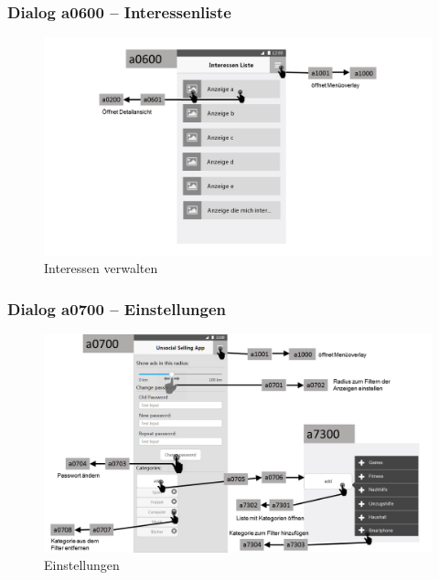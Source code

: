 \documentclass[a4paper,12pt,oneside]{scrartcl}
\begin{document}
\subsubsection{Dialog a0600 – Interessenliste}
\begin{figure}[!htbp]
\centering
\noindent\includegraphics[width=\linewidth,height=\textheight,keepaspectratio]{Dialoge/a0600}
\caption{Interessen verwalten}
\end{figure}
\FloatBarrier

\subsubsection{Dialog a0700 – Einstellungen}
\begin{figure}[!htbp]
\centering
\noindent\includegraphics[width=\linewidth,height=\textheight,keepaspectratio]{Dialoge/a0700}
\caption{Einstellungen}
\end{figure}
\FloatBarrier
\end{document}
